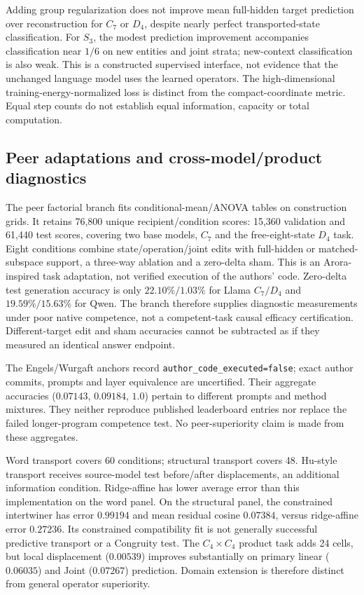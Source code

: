 Adding group regularization does not improve mean full-hidden target prediction over reconstruction for $C_7$ or $D_4$, despite nearly perfect transported-state classification. For $S_3$, the modest prediction improvement accompanies classification near $1/6$ on new entities and joint strata; new-context classification is also weak. This is a constructed supervised interface, not evidence that the unchanged language model uses the learned operators. The high-dimensional training-energy-normalized loss is distinct from the compact-coordinate metric. Equal step counts do not establish equal information, capacity or total computation.

\subsection{Peer adaptations and cross-model/product diagnostics}

The peer factorial branch fits conditional-mean/ANOVA tables on construction grids. It retains 76,800 unique recipient/condition scores: 15,360 validation and 61,440 test scores, covering two base models, $C_7$ and the free-eight-state $D_4$ task. Eight conditions combine state/operation/joint edits with full-hidden or matched-subspace support, a three-way ablation and a zero-delta sham. This is an Arora-inspired task adaptation, not verified execution of the authors' code. Zero-delta test generation accuracy is only $22.10\%/1.03\%$ for Llama $C_7/D_4$ and $19.59\%/15.63\%$ for Qwen. The branch therefore supplies diagnostic measurements under poor native competence, not a competent-task causal efficacy certification. Different-target edit and sham accuracies cannot be subtracted as if they measured an identical answer endpoint.

The Engels/Wurgaft anchors record \texttt{author\_code\_executed=false}; exact author commits, prompts and layer equivalence are uncertified. Their aggregate accuracies ($0.07143$, $0.09184$, $1.0$) pertain to different prompts and method mixtures. They neither reproduce published leaderboard entries nor replace the failed longer-program competence test. No peer-superiority claim is made from these aggregates.

Word transport covers 60 conditions; structural transport covers 48. Hu-style transport receives source-model test before/after displacements, an additional information condition. Ridge-affine has lower average error than this implementation on the word panel. On the structural panel, the constrained intertwiner has error $0.99194$ and mean residual cosine $0.07384$, versus ridge-affine error $0.27236$. Its constrained compatibility fit is not generally successful predictive transport or a Congruity test. The $C_4\times C_4$ product task adds 24 cells, but local displacement ($0.00539$) improves substantially on primary linear ($0.06035$) and Joint ($0.07267$) prediction. Domain extension is therefore distinct from general operator superiority.

